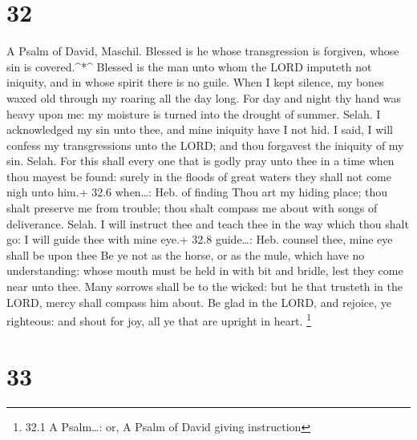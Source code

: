 \hypertarget{section-31}{%
\section{32}\label{section-31}}

A Psalm of David, Maschil.  Blessed is he whose
transgression is forgiven, whose sin is covered.\^{}*\^{} 
Blessed is the man unto whom the LORD imputeth not iniquity, and in
whose spirit there is no guile.  When I kept silence, my
bones waxed old through my roaring all the day long.  For
day and night thy hand was heavy upon me: my moisture is turned into the
drought of summer. Selah.  I acknowledged my sin unto thee,
and mine iniquity have I not hid. I said, I will confess my
transgressions unto the LORD; and thou forgavest the iniquity of my sin.
Selah.  For this shall every one that is godly pray unto
thee in a time when thou mayest be found: surely in the floods of great
waters they shall not come nigh unto him.+ 32.6 when\ldots: Heb. of
finding  Thou art my hiding place; thou shalt preserve me
from trouble; thou shalt compass me about with songs of deliverance.
Selah.  I will instruct thee and teach thee in the way which
thou shalt go: I will guide thee with mine eye.+ 32.8 guide\ldots: Heb.
counsel thee, mine eye shall be upon thee  Be ye not as the
horse, or as the mule, which have no understanding: whose mouth must be
held in with bit and bridle, lest they come near unto thee.
 Many sorrows shall be to the wicked: but he that trusteth
in the LORD, mercy shall compass him about.  Be glad in the
LORD, and rejoice, ye righteous: and shout for joy, all ye that are
upright in heart. \footnote{32.1 A Psalm\ldots: or, A Psalm of David
  giving instruction}

\hypertarget{section-32}{%
\section{33}\label{section-32}}

